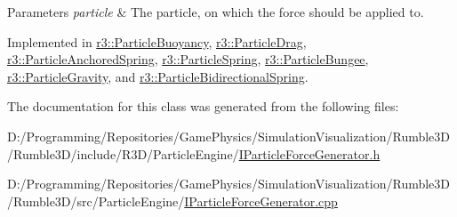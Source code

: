 \begin{DoxyParams}{Parameters}
{\em particle} & The particle, on which the force should be applied to. \\
\hline
\end{DoxyParams}


Implemented in \mbox{\hyperlink{classr3_1_1_particle_buoyancy_afb3fc83d65052567b972e139ce167995}{r3\+::\+Particle\+Buoyancy}}, \mbox{\hyperlink{classr3_1_1_particle_drag_a9bbaf7be2a4a4252cf5e9364d97ec5b7}{r3\+::\+Particle\+Drag}}, \mbox{\hyperlink{classr3_1_1_particle_anchored_spring_a8c5690a32a5061582989d5915a84cff8}{r3\+::\+Particle\+Anchored\+Spring}}, \mbox{\hyperlink{classr3_1_1_particle_spring_a16f6dd1c995223af3a15ff9a1e2eb375}{r3\+::\+Particle\+Spring}}, \mbox{\hyperlink{classr3_1_1_particle_bungee_a416f7100f9d859b0152ef6f8e551c2c1}{r3\+::\+Particle\+Bungee}}, \mbox{\hyperlink{classr3_1_1_particle_gravity_a2730d87272fcc1c29d143f3a7eb8ffa9}{r3\+::\+Particle\+Gravity}}, and \mbox{\hyperlink{classr3_1_1_particle_bidirectional_spring_a13ac531b70d2884364fba66aae55b5fb}{r3\+::\+Particle\+Bidirectional\+Spring}}.



The documentation for this class was generated from the following files\+:\begin{DoxyCompactItemize}
\item 
D\+:/\+Programming/\+Repositories/\+Game\+Physics/\+Simulation\+Visualization/\+Rumble3\+D/\+Rumble3\+D/include/\+R3\+D/\+Particle\+Engine/\mbox{\hyperlink{_i_particle_force_generator_8h}{I\+Particle\+Force\+Generator.\+h}}\item 
D\+:/\+Programming/\+Repositories/\+Game\+Physics/\+Simulation\+Visualization/\+Rumble3\+D/\+Rumble3\+D/src/\+Particle\+Engine/\mbox{\hyperlink{_i_particle_force_generator_8cpp}{I\+Particle\+Force\+Generator.\+cpp}}\end{DoxyCompactItemize}
